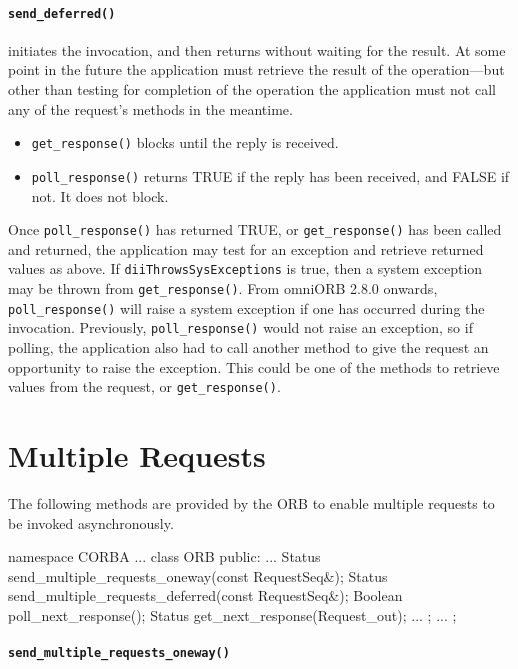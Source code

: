 \documentclass[11pt,twoside,a4paper]{book}
\newcommand{\code}[1]{\texttt{#1}}
\newcommand{\op}[1]{\texttt{#1()}}
\begin{document}
\paragraph{\op{send\_deferred}}

initiates the invocation, and then returns without waiting for the
result. At some point in the future the application must retrieve the
result of the operation---but other than testing for completion of the
operation the application must not call any of the request's methods
in the meantime.

\begin{itemize}
\item \op{get\_response} blocks until the reply is received.
\item \op{poll\_response} returns TRUE if the reply has been received,
      and FALSE if not. It does not block.
\end{itemize}

Once \op{poll\_response} has returned TRUE, or \op{get\_response} has
been called and returned, the application may test for an exception
and retrieve returned values as above. If
\code{diiThrowsSysExceptions} is true, then a system exception may be
thrown from \op{get\_response}.  From omniORB 2.8.0 onwards,
\op{poll\_response} will raise a system exception if one has occurred
during the invocation. Previously, \op{poll\_response} would not raise
an exception, so if polling, the application also had to call another
method to give the request an opportunity to raise the exception. This
could be one of the methods to retrieve values from the request, or
\op{get\_response}.


\section{Multiple Requests}

The following methods are provided by the ORB to enable multiple requests to
be invoked asynchronously.

\begin{cxxlisting}
namespace CORBA {
  ...
  class ORB {
  public:
    ...
    Status send_multiple_requests_oneway(const RequestSeq&);
    Status send_multiple_requests_deferred(const RequestSeq&);
    Boolean poll_next_response();
    Status get_next_response(Request_out);
    ...
  };
  ...
};
\end{cxxlisting}

\paragraph{\op{send\_multiple\_requests\_oneway}}
\end{document}
